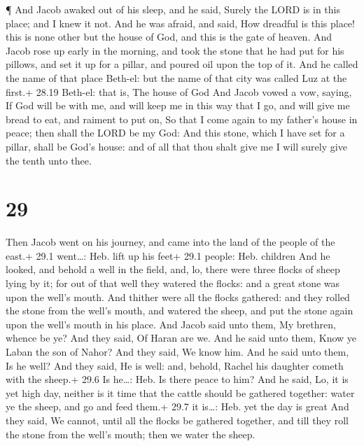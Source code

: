 ¶ And Jacob awaked out of his sleep, and he said, Surely
the LORD is in this place; and I knew it not.  And he was
afraid, and said, How dreadful is this place! this is none other but the
house of God, and this is the gate of heaven.  And Jacob
rose up early in the morning, and took the stone that he had put for his
pillows, and set it up for a pillar, and poured oil upon the top of it.
 And he called the name of that place Beth-el: but the name
of that city was called Luz at the first.+ 28.19 Beth-el: that is, The
house of God  And Jacob vowed a vow, saying, If God will be
with me, and will keep me in this way that I go, and will give me bread
to eat, and raiment to put on,  So that I come again to my
father's house in peace; then shall the LORD be my God: 
And this stone, which I have set for a pillar, shall be God's house: and
of all that thou shalt give me I will surely give the tenth unto thee.

\hypertarget{section-28}{%
\section{29}\label{section-28}}

 Then Jacob went on his journey, and came into the land of
the people of the east.+ 29.1 went\ldots: Heb. lift up his feet+ 29.1
people: Heb. children  And he looked, and behold a well in
the field, and, lo, there were three flocks of sheep lying by it; for
out of that well they watered the flocks: and a great stone was upon the
well's mouth.  And thither were all the flocks gathered: and
they rolled the stone from the well's mouth, and watered the sheep, and
put the stone again upon the well's mouth in his place.  And
Jacob said unto them, My brethren, whence be ye? And they said, Of Haran
are we.  And he said unto them, Know ye Laban the son of
Nahor? And they said, We know him.  And he said unto them,
Is he well? And they said, He is well: and, behold, Rachel his daughter
cometh with the sheep.+ 29.6 Is he\ldots: Heb. Is there peace to him?
 And he said, Lo, it is yet high day, neither is it time
that the cattle should be gathered together: water ye the sheep, and go
and feed them.+ 29.7 it is\ldots: Heb. yet the day is great 
And they said, We cannot, until all the flocks be gathered together, and
till they roll the stone from the well's mouth; then we water the sheep.

